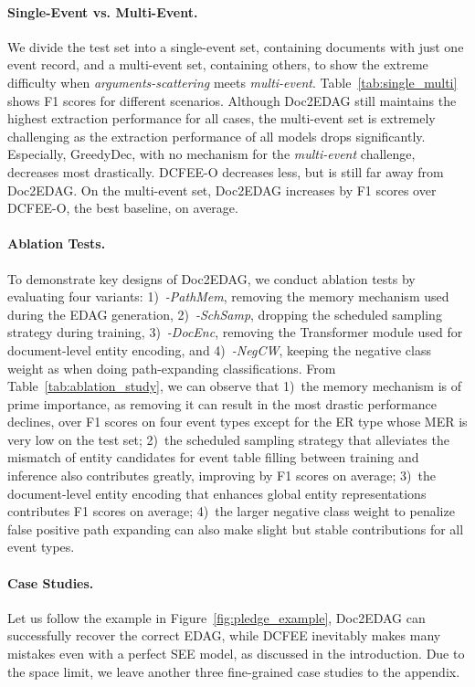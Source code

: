 \documentclass[11pt,a4paper]{article}
\begin{document}
\paragraph{Single-Event vs. Multi-Event.}
We divide the test set into a single-event set, containing documents with just one event record, and a multi-event set, containing others, to show the extreme difficulty when \textit{arguments-scattering} meets \textit{multi-event}.
Table~\ref{tab:single_multi} shows F1 scores for different scenarios.
Although Doc2EDAG still maintains the highest extraction performance for all cases,
the multi-event set is extremely challenging as the extraction performance of all models drops significantly.
Especially, GreedyDec, with no mechanism for the \textit{multi-event} challenge, decreases most drastically.
DCFEE-O decreases less, but is still far away from Doc2EDAG.
On the multi-event set, Doc2EDAG increases by  F1 scores over DCFEE-O, the best baseline, on average.

\paragraph{Ablation Tests.}
To demonstrate key designs of Doc2EDAG,
we conduct ablation tests by evaluating four variants:
1)~\textit{-PathMem}, removing the memory mechanism used during the EDAG generation,
2)~\textit{-SchSamp}, dropping the scheduled sampling strategy during training,
3)~\textit{-DocEnc}, removing the Transformer module used for document-level entity encoding,
and 4)~\textit{-NegCW}, keeping the negative class weight as  when doing path-expanding classifications.
From Table~\ref{tab:ablation_study}, we can observe that
1)~the memory mechanism is of prime importance, as removing it can result in the most drastic performance declines, over  F1 scores on four event types except for the ER type whose MER is very low on the test set;
2)~the scheduled sampling strategy that alleviates the mismatch of entity candidates for event table filling between training and inference also contributes greatly, improving by  F1 scores on average;
3)~the document-level entity encoding that enhances global entity representations contributes  F1 scores on average;
4)~the larger negative class weight to penalize false positive path expanding can also make slight but stable contributions for all event types.

\paragraph{Case Studies.}
Let us follow the example in Figure~\ref{fig:pledge_example}, Doc2EDAG can successfully recover the correct EDAG, while DCFEE inevitably makes many mistakes even with a perfect SEE model, as discussed in the introduction.
Due to the space limit, we leave another three fine-grained case studies to the appendix.
\end{document}

